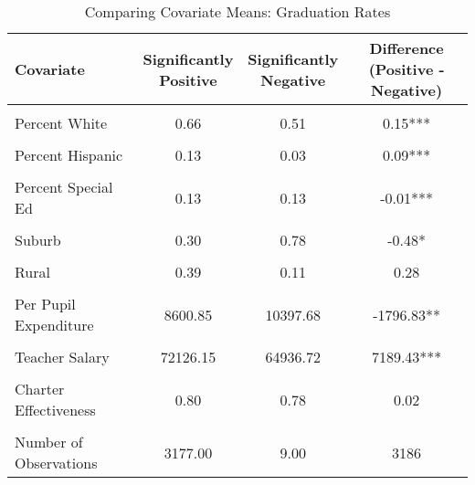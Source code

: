 \begin{table}[!h]
\centering
\caption{\label{tab:cov_means_afgr}Comparing Covariate Means: Graduation Rates}
\centering
\begin{tabular}[t]{lccc}
\toprule
Covariate & \makecell[c]{Significantly\\Positive} & \makecell[c]{Significantly\\Negative} & \makecell[c]{Difference\\(Positive - Negative)}\\
\midrule
\cellcolor{gray!10}{Log of Enrollment} & \cellcolor{gray!10}{8.02} & \cellcolor{gray!10}{7.77} & \cellcolor{gray!10}{0.25***}\\
Percent White & 0.66 & 0.51 & 0.15***\\
\cellcolor{gray!10}{Percent Black} & \cellcolor{gray!10}{0.17} & \cellcolor{gray!10}{0.42} & \cellcolor{gray!10}{-0.25***}\\
Percent Hispanic & 0.13 & 0.03 & 0.09***\\
\cellcolor{gray!10}{Percent Free/Reduced Lunch} & \cellcolor{gray!10}{0.32} & \cellcolor{gray!10}{0.44} & \cellcolor{gray!10}{-0.12***}\\
Percent Special Ed & 0.13 & 0.13 & -0.01***\\
\cellcolor{gray!10}{Urban} & \cellcolor{gray!10}{0.14} & \cellcolor{gray!10}{0.00} & \cellcolor{gray!10}{0.14***}\\
Suburb & 0.30 & 0.78 & -0.48*\\
\cellcolor{gray!10}{Town} & \cellcolor{gray!10}{0.17} & \cellcolor{gray!10}{0.11} & \cellcolor{gray!10}{0.06}\\
Rural & 0.39 & 0.11 & 0.28\\
\cellcolor{gray!10}{Per Pupil Revenue} & \cellcolor{gray!10}{8536.88} & \cellcolor{gray!10}{10076.27} & \cellcolor{gray!10}{-1539.39*}\\
Per Pupil Expenditure & 8600.85 & 10397.68 & -1796.83**\\
\cellcolor{gray!10}{Student-Teacher Ratio} & \cellcolor{gray!10}{16.17} & \cellcolor{gray!10}{15.52} & \cellcolor{gray!10}{0.65***}\\
Teacher Salary & 72126.15 & 64936.72 & 7189.43***\\
\cellcolor{gray!10}{Number of Magnet Schools} & \cellcolor{gray!10}{0.10} & \cellcolor{gray!10}{0.11} & \cellcolor{gray!10}{-0.01}\\
Charter Effectiveness & 0.80 & 0.78 & 0.02\\
\cellcolor{gray!10}{Baseline Performance} & \cellcolor{gray!10}{0.76} & \cellcolor{gray!10}{0.82} & \cellcolor{gray!10}{-0.07***}\\
\midrule
Number of Observations & 3177.00 & 9.00 & 3186\\
\bottomrule
\end{tabular}
\end{table}
